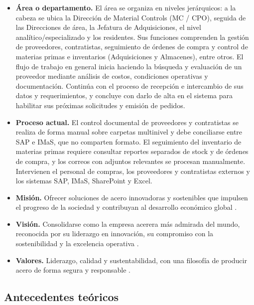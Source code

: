 \begin{itemize}
 \item \textbf{Área o departamento.} El área se organiza en niveles jerárquicos: a la cabeza se ubica la Dirección de Material Controls (MC / CPO), seguida de las Direcciones de área, la Jefatura de Adquisiciones, el nivel analítico/especializado y los residentes. Sus funciones comprenden la gestión de proveedores, contratistas, seguimiento de órdenes de compra y control de materias primas e inventarios (Adquisiciones y Almacenes), entre otros. El flujo de trabajo en general inicia haciendo la búsqueda y evaluación de un proveedor mediante análisis de costos, condiciones operativas y documentación. Continúa con el proceso de recepción e intercambio de sus datos y requerimientos, y concluye con darlo de alta en el sistema para habilitar sus próximas solicitudes y emisión de pedidos.

 \item \textbf{Proceso actual.} El control documental de proveedores y contratistas se realiza de forma manual sobre carpetas multinivel y debe conciliarse entre SAP e IMaS, que no comparten formato. El seguimiento del inventario de materias primas requiere consultar reportes separados de stock y de órdenes de compra, y los correos con adjuntos relevantes se procesan manualmente. Intervienen el personal de compras, los proveedores y contratistas externos y los sistemas SAP, IMaS, SharePoint y Excel.
  
 \item \textbf{Misión.} Ofrecer soluciones de acero innovadoras y sostenibles que impulsen el progreso de la sociedad y contribuyan al desarrollo económico global \cite{arcelormittal2026mexico}.
 
 \item \textbf{Visión.} Consolidarse como la empresa acerera más admirada del mundo, reconocida por su liderazgo en innovación, su compromiso con la sostenibilidad y la excelencia operativa \cite{arcelormittal2026mexico}.
 
 \item \textbf{Valores.} Liderazgo, calidad y sustentabilidad, con una filosofía de producir acero de forma segura y responsable \cite{arcelormittal2026mexico}.
\end{itemize}

\subsection{Antecedentes teóricos} \label{sec:antecedentes_teoricos} %

